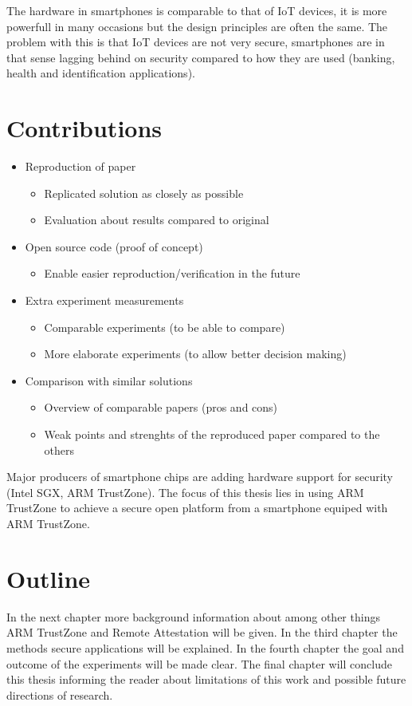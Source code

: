 \documentclass{report}
\begin{document}
The hardware in smartphones is comparable to that of IoT devices, it is more powerfull in many occasions but the design principles are often the same. The problem with this is that IoT devices are not very secure, smartphones are in that sense lagging behind on security compared to how they are used (banking, health and identification applications).

\section{Contributions}

\begin{itemize}
\item Reproduction of paper \begin{itemize}
\item Replicated solution as closely as possible
\item Evaluation about results compared to original
\end{itemize}
\item Open source code (proof of concept) \begin{itemize}
\item Enable easier reproduction/verification in the future
\end{itemize}
\item Extra experiment measurements \begin{itemize}
\item Comparable experiments (to be able to compare)
\item More elaborate experiments (to allow better decision making)
\end{itemize}
\item Comparison with similar solutions \begin{itemize}
\item Overview of comparable papers (pros and cons)
\item Weak points and strenghts of the reproduced paper compared to the others
\end{itemize}
\end{itemize}

Major producers of smartphone chips are adding hardware support for security (Intel SGX, ARM TrustZone). The focus of this thesis lies in using ARM TrustZone to achieve a secure open platform from a smartphone equiped with ARM TrustZone.

\section{Outline}

In the next chapter more background information about among other things ARM TrustZone and Remote Attestation will be given. In the third chapter the methods secure applications will be explained. In the fourth chapter the goal and outcome of the experiments will be made clear. The final chapter will conclude this thesis informing the reader about limitations of this work and possible future directions of research.
\end{document}
